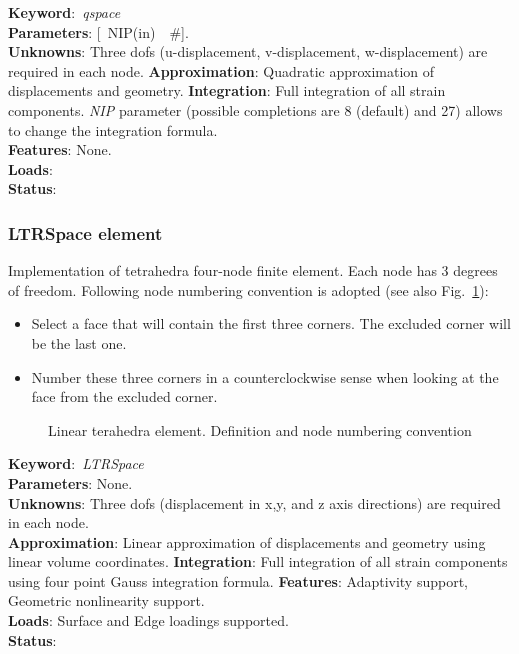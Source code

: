 \documentclass[12pt,dvips]{article}
\newcommand{\descitem}[1]{{\noindent \bf #1}:}
\newcommand{\elemkeyword}[1]{\descitem{Keyword}~{\em #1}}
\newcommand{\elemparam}[2]{{{#1\tiny (#2)}~~\#}}
\newcommand{\optelemparam}[2]{{[~\elemparam{#1}{#2}]}}
\newcommand{\param}[1]{{\it #1}}
\begin{document}
\elemkeyword{qspace}\\
\descitem{Parameters} \optelemparam{NIP}{in}. \\
\descitem{Unknowns}
Three dofs (u-displacement, v-displacement, w-displacement) are required in each node.
\descitem{Approximation} Quadratic approximation of displacements and
geometry.
\descitem{Integration}
Full integration of all strain components.
\param{NIP} parameter (possible completions are 8 (default) and 27)
allows to change the integration formula.\\
\descitem{Features} None.\\
\descitem{Loads} \\
\descitem{Status} 

\subsubsection{LTRSpace element}
Implementation of tetrahedra four-node finite element. 
Each node has 3 degrees of freedom.
Following node numbering convention is adopted (see also Fig.~\ref{lintetrahedron_fig}):
\begin{itemize}
\item Select a face that will contain the first three corners. The excluded corner will be the last one.
\item Number these three corners in a counterclockwise sense when looking at the face from the
      excluded corner.
\end{itemize}
 
\begin{figure}[tb]
\begin{center}\end{center}
\caption{Linear terahedra element. Definition and node numbering convention}
\label{lintetrahedron_fig}
\end{figure}

\elemkeyword{LTRSpace}\\
\descitem{Parameters} None.\\
\descitem{Unknowns}
Three dofs (displacement in x,y, and z axis directions) are required in each node.\\
\descitem{Approximation} Linear approximation of displacements and
geometry using linear volume coordinates.
\descitem{Integration}
Full integration of all strain components using four point Gauss integration formula.
\descitem{Features} Adaptivity support, Geometric nonlinearity support.\\
\descitem{Loads} Surface and Edge loadings supported.\\
\descitem{Status} 
\end{document}

